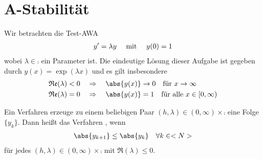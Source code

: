 \section{A-Stabilität}

Wir betrachten die Test-AWA
\begin{align}
	\label{3_29}
	y'=\lambda y\quad\mit\quad y(0)=1
\end{align}
wobei $\lambda\in\comp$ ein Parameter ist. Die eindeutige Lösung dieser Aufgabe ist gegeben durch $y(x)=\exp(\lambda x)$ und es gilt insbesondere
\begin{align}
	\Re(\lambda)&< 0 \quad\Rightarrow\quad \abs{y(x)}\to 0 \quad\text{für } x\to\infty \notag \\
	\Re(\lambda)&=0 \quad\Rightarrow\quad\abs{y(x)}=1 \quad\text{für alle } x\in[0,\infty) \notag
\end{align}

\begin{definition}[A-Stabilität]
	Ein Verfahren erzeuge zu einem beliebigen Paar $(h,\lambda)\in(0,\infty)\times\comp$ eine Folge $\{y_k\}$. Dann heißt das Verfahren , wenn
	\begin{align}
		\abs{y_{k+1}} \le \abs{y_k}\quad\forall k\in\natur\notag
	\end{align}
	für jedes $(h,\lambda)\in (0,\infty)\times\comp$ mit $\Re(\lambda)\le 0$.
\end{definition}

